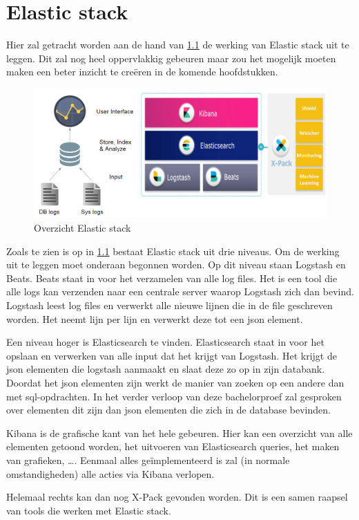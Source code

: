 
\chapter{Elastic stack}
\label{ch:elasticstack}

Hier zal getracht worden aan de hand van \ref{fig:elasticstackoverview} de werking van Elastic stack uit te leggen. Dit zal nog heel oppervlakkig gebeuren maar zou het mogelijk moeten maken een beter inzicht te creëren in de komende hoofdstukken.

\begin{figure}[h]
	\includegraphics[width=16cm]{img/elasticstackoverview}
	\caption{Overzicht Elastic stack}
	\label{fig:elasticstackoverview}
\end{figure}

Zoals te zien is op in \ref{fig:elasticstackoverview} bestaat Elastic stack uit drie niveaus. 
Om de werking uit te leggen moet onderaan begonnen worden. Op dit niveau staan Logstash en Beats. 
Beats staat in voor het verzamelen van alle log files. Het is een tool die alle logs kan verzenden naar een centrale server waarop Logstash zich dan bevind. Logstash leest log files en verwerkt alle nieuwe lijnen die in de file geschreven worden. Het neemt lijn per lijn en verwerkt deze tot een json element.

Een niveau hoger is Elasticsearch te vinden. Elasticsearch staat in voor het opslaan en verwerken van alle input dat het krijgt van Logstash. Het krijgt de json elementen die logstash aanmaakt en slaat deze zo op in zijn databank. Doordat het json elementen zijn werkt de manier van zoeken op een andere dan met sql-opdrachten. In het verder verloop van deze bachelorproef zal gesproken over elementen dit zijn dan json elementen die zich in de database bevinden.

Kibana is de grafische kant van het hele gebeuren. Hier kan een overzicht van alle elementen getoond worden, het uitvoeren van Elasticsearch queries, het maken van grafieken, \dots.
Eenmaal alles geïmplementeerd is zal (in normale omstandigheden) alle acties via Kibana verlopen.

Helemaal rechts kan dan nog X-Pack gevonden worden. Dit is een samen raapsel van tools die werken met Elastic stack. 